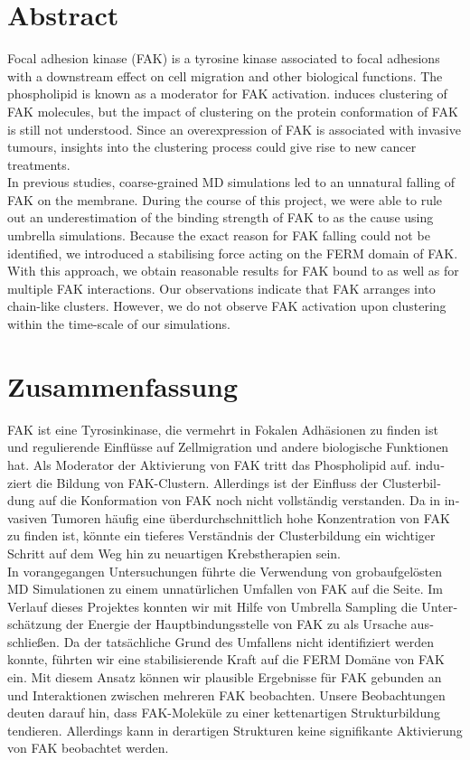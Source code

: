 \chapter*{Abstract}
Focal adhesion kinase (FAK) is a tyrosine kinase associated to focal adhesions with a downstream effect on cell migration and other biological functions. The phospholipid \pip{} is known as a moderator for FAK activation. \pip{} induces clustering of FAK molecules, but the impact of clustering on the protein conformation of FAK is still not understood. Since an overexpression of FAK is associated with invasive tumours, insights into the clustering process could give rise to new cancer treatments.\\
In previous studies, coarse-grained MD simulations led to an unnatural falling of FAK on the membrane. During the course of this project, we were able to rule out an underestimation of the binding strength of FAK to \pip{} as the cause using umbrella simulations. Because the exact reason for FAK falling could not be identified, we introduced a stabilising force acting on the FERM domain of FAK. With this approach, we obtain reasonable results for FAK bound to \pip{} as well as for multiple FAK interactions. Our observations indicate that FAK arranges into chain-like clusters. However, we do not observe FAK activation upon clustering within the time-scale of our simulations.
\newpage
\leavevmode\thispagestyle{empty}\newpage
\chapter*{Zusammenfassung}
\begin{german}
	FAK ist eine Tyrosinkinase, die vermehrt in Fokalen Adhäsionen zu finden ist und regulierende Einflüsse auf Zellmigration und andere biologische Funktionen hat. Als Moderator der Aktivierung von FAK tritt das Phospholipid \pip{} auf. \pip{} induziert die Bildung von FAK-Clustern. Allerdings ist der Einfluss der Clusterbildung auf die Konformation von FAK noch nicht vollständig verstanden. Da in invasiven Tumoren häufig eine überdurchschnittlich hohe Konzentration von FAK zu finden ist, könnte ein tieferes Verständnis der Clusterbildung ein wichtiger Schritt auf dem Weg hin zu neuartigen Krebstherapien sein.\\
	In vorangegangen Untersuchungen führte die Verwendung von grobaufgelösten MD Simulationen zu einem unnatürlichen Umfallen von FAK auf die Seite. Im Verlauf dieses Projektes konnten wir mit Hilfe von Umbrella Sampling die Unterschätzung der Energie der Hauptbindungsstelle von FAK zu \pip{} als Ursache ausschließen. Da der tatsächliche Grund des Umfallens nicht identifiziert werden konnte, führten wir eine stabilisierende Kraft auf die FERM Domäne von FAK ein. Mit diesem Ansatz können wir plausible Ergebnisse für FAK gebunden an \pip{} und Interaktionen zwischen mehreren FAK beobachten. Unsere Beobachtungen deuten darauf hin, dass FAK-Moleküle zu einer kettenartigen Strukturbildung tendieren. Allerdings kann in derartigen Strukturen keine signifikante Aktivierung von FAK beobachtet werden.
\end{german}
\newpage
